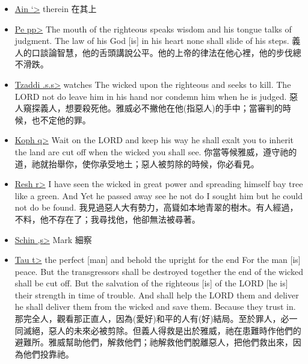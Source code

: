 \begin{itemize}
\item \underline{Ain \<`>} therein 在其上
\item \underline{Pe \<pp>} The mouth of the righteous speaks wisdom and his tongue talks of judgment. The law of his God [is] in his heart none shall slide of his steps. 義人的口談論智慧，他的舌頭講說公平。他的上帝的律法在他心裡，他的步伐總不滑跌。
\item \underline{Tzaddi \<.s.s>} watches The wicked upon the righteous and seeks to kill. The LORD not do leave him in his hand nor condemn him when he is judged.  惡人窺探義人，想要殺死他。雅威必不撇他在他(指惡人)的手中；當審判的時候，也不定他的罪。
\item \underline{Koph \<q>} Wait on the LORD and keep his way he shall exalt you to inherit the land are cut off when the wicked you shall see. 你當等候雅威，遵守祂的道，祂就抬舉你，使你承受地土；惡人被剪除的時候，你必看見。
\item \underline{Resh  \<r>} I have seen the wicked in great power and spreading himself bay tree like a green. And Yet he passed away see he not do I sought him but he could not do be found. 我見過惡人大有勢力，高聳如本地青翠的樹木。有人經過，不料，他不存在了；我尋找他，他卻無法被尋著。
\item \underline{Schin \<,s>} Mark 細察
\item \underline{Tau \<t>}  the perfect [man] and behold the upright for the end For the man [is] peace. But the transgressors shall be destroyed together the end of the wicked shall be cut off. But the salvation of the righteous [is] of the LORD [he is] their strength in time of trouble. And shall help the LORD them and deliver he shall deliver them from the wicked and save them. Because they trust in. 那完全人，觀看那正直人，因為(愛好)和平的人有(好)結局。至於罪人，必一同滅絕，惡人的未來必被剪除。但義人得救是出於雅威，祂在患難時作他們的避難所。雅威幫助他們，解救他們；祂解救他們脫離惡人，把他們救出來，因為他們投靠祂。
\end{itemize}












